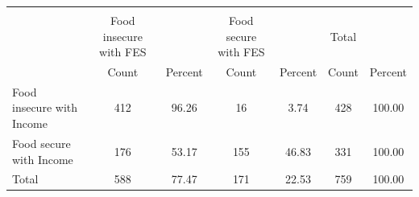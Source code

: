 {
\def\sym#1{\ifmmode^{#1}\else\(^{#1}\)\fi}
\begin{tabular}{l*{3}{cc}}
\hline\hline
            &\multicolumn{6}{c}{}                                                                           \\
            &Food insecure with FES&               &Food secure with FES&               &          Total&               \\
            &          Count&        Percent&          Count&        Percent&          Count&        Percent\\
\hline
Food insecure with Income&            412&          96.26&             16&           3.74&            428&         100.00\\
Food secure with Income&            176&          53.17&            155&          46.83&            331&         100.00\\
Total       &            588&          77.47&            171&          22.53&            759&         100.00\\
\hline\hline
\end{tabular}
}
